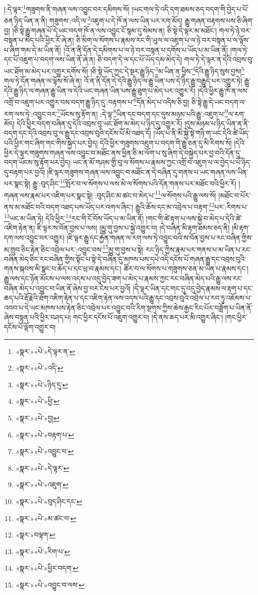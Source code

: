 །:དེ་ལྟར་\footnote{«སྣར་»«པེ་»དེ་ལྟར་ན་}གཟུགས་ནི་གཞན་ལས་འབྱུང་བར་དམིགས་སོ། །ཡང་གལ་ཏེ་འདི་དག་ཐམས་ཅད་བདག་གི་བྱེད་པ་པོ་ཅན་ཉིད་ཡིན་ན་ནི། གཟུགས་:འདི་ལ་\footnote{«སྣར་»«པེ་»འདི་}འཇུག་པ་དེ་ཁོ་ན་ལས་ཡིན་པར་རག་མོད། རྒྱུ་གཞན་བརྟགས་པས་ཅི་ཞིག་བྱ། །ཅི་སྟེ་རྒྱུ་གཞན་པོ་དེ་ཡང་བདག་ཁོ་ན་ལས་འབྱུང་ངོ་སྙམ་དུ་སེམས་ན། ཅི་སྟེ་དེ་ལྟར་མ་མཐོང་། གལ་ཏེ་ཉེ་བར་བསྟན་པ་མེད་པའི་ཕྱིར་རོ་ཞེ་ན། ཅི་མིག་ལ་སོགས་པ་རྣམས་རང་གི་ཡུལ་ལ་འཇུག་པ་ལ་ཉེ་བར་བསྟན་པ་ལ་ལྟོས་པ་ཞིག་གམ་དེ་མ་ཡིན་ནོ། །འོ་ན་ནི་དོན་དེ་དམིགས་པ་ལ་ཉེ་བར་བསྟན་པ་དགོས་པ་ཡོད་པ་མ་ཡིན་ནོ། །གལ་ཏེ་དང་པོ་འཇུག་པ་བདག་ལས་ཡིན་ནོ་ཞེ་ན། ཅི་བདག་དེ་ལ་དང་པོ་ཡོད་དམ་མེད་དེ། གལ་ཏེ་དེ་ལྟར་ན་དེའི་འབྲས་བུ་ཡང་ཐོག་མ་མེད་པར་འགྱུར་དགོས་སོ། །ཅི་སྟེ་ཡོད་ཀྱང་དེ་སྔར་རྒྱུ་ཉིད་\footnote{«སྣར་»«པེ་»ཉིད་དུ་}མ་ཡིན་ན་ཕྱིས་\footnote{«སྣར་»«པེ་»ཕྱི་}དེའི་རྒྱུ་ཉིད་སུས་བྱས།\footnote{«སྣར་»«པེ་»བྱ།} གལ་ཏེ་དོན་གཞན་ལ་ལྟོས་སོ་ཞེ་ན། འོ་ན་ནི་དོན་དེ་དེའི་རྒྱུ་ཉིད་ལ་རྒྱུ་ཡིན་པས་དེ་ཉིད་རྒྱུ་བརྒྱུད་པར་འགྱུར་ཏེ། རྒྱུ་དེའི་རྒྱུ་ཉིད་ལ་གཞན་རྒྱུ་ཡིན་ལ་དེའི་ཡང་གཞན་ཡིན་པས་རྒྱུ་ཐུག་པ་མེད་པར་འགྱུར་རོ། །དེའི་ཕྱིར་རྒྱུ་ཁོ་ན་ལས་འགྲོ་བ་འཇུག་པར་འགྱུར་བས་བདག་རྒྱུ་ཉིད་དུ་:བརྟགས་པ་\footnote{«སྣར་»«པེ་»བརྟག་པ་}དོན་མེད་པ་འདིས་ཅི་བྱ། ཅི་སྟེ་རྒྱུ་དེ་ཡང་བདག་ལ་རག་ལས་ཏེ་:འབྱུང་བར་\footnote{«སྣར་»«པེ་»འབྱུང་བ་}ཡོངས་སུ་རྟོག་ན། :དེ་ལྟ་\footnote{«སྣར་»«པེ་»དེ་ལྟར་}ཡིན་དང་བདག་དང་དུས་མཉམ་པའི་རྒྱུ་:འཇུག་པ་\footnote{«སྣར་»«པེ་»འཇུག་}ལ་རག་མོད། དེའི་ཕྱིར་བདག་བཞིན་དུ་དེའི་འབྲས་བུ་ཡང་ཐོག་མ་མེད་པ་ཉིད་དུ་འགྱུར་རོ། །དུས་མཉམ་པ་ཉིད་ཡིན་ན་ནི་བདག་དང་དེའི་འབྲས་བུ་ལ་རྒྱུ་དང་འབྲས་བུའི་དངོས་པོ་མི་འཐད་དོ། །ཡོད་པ་ནི་མི་སྐྱེ་སྟེ་གཉི་ག་ཡང་དེའི་ཚེ་ཡོད་པའི་ཕྱིར་གང་ཞིག་གང་གིས་སྐྱེད་པར་བྱེད། དེའི་ཕྱིར་གཟུགས་འཇུག་པ་བདག་གི་རྒྱུ་ཅན་དུ་མི་རིགས་སོ། །དེའི་ཕྱིར་དེ་ལྟར་གཟུགས་གཞན་ལས་འབྱུང་བ་མཐོང་ནས་ཕྱིན་ཅི་མ་ལོག་པ་སུ་ཞིག་དེ་བསྐྱེད་པར་བྱ་བའི་དོན་དུ་བདག་ཡོངས་སུ་རྟོག་པར་བྱེད། ཡང་ན་མོ་གཤམ་གྱི་བུ་ལ་སོགས་པ་རྣམས་ཀྱང་འགྲོ་བ་འཇུག་པ་ལ་བྱེད་པ་པོ་ཉིད་དུ་བརྟག་པར་བྱའོ། །ཇི་ལྟར་གཟུགས་གཞན་ལས་འབྱུང་བ་མཐོང་ན་དེ་བཞིན་དུ་གནས་པ་ཡང་གཞན་ལས་ཡིན་པར་སྣང་སྟེ། རྒྱུ་:བུད་ཤིང་\footnote{«སྣར་»«པེ་»བུད་ཤིང་དང་}སྤོར་བ་ལ་སོགས་པ་ལས་མེ་ལ་སོགས་པའི་དོན་གནས་པར་མཐོང་བའི་ཕྱིར་རོ། །གཞན་ལས་རྣམ་པར་འཇིག་པར་སྣང་སྟེ། :བུད་ཤིང་མ་ཚང་བ་མེད་པ་\footnote{«སྣར་»«པེ་»མ་ཚང་བ་}ལ་སོགས་པའི་རྒྱུ་ལས་སོ། །མཐོང་བ་པོར་ནས་མ་མཐོང་བའི་བདག་འཐད་པས་ཡོད་པར་འགལ་ཞིང་། རྒྱུའི་ཆོས་དང་མ་འབྲེལ་པ་བརྟག་\footnote{«སྣར་»བལྟག་}པར་:རིགས་པ་\footnote{«སྣར་»«པེ་»རིག་པ་}ཡང་མ་ཡིན་ཏེ། དེའི་ཕྱིར་\footnote{«སྣར་»«པེ་»ཕྱིར་བདག་}རང་གི་ངོ་བོས་ཡོད་པ་མ་ཡིན་ནོ། །གང་གི་ཚེ་རྟག་པ་ལས་སྐྱེ་བ་མེད་པ་དེའི་ཚེ་འཇིག་རྟེན་ན། ཇི་ལྟར་ས་བོན་བྱས་པ་ལས། །མྱུ་གུ་བྱས་པ་སྐྱེ་འགྱུར་བ། །དེ་བཞིན་མི་རྟག་ཐམས་ཅད་ནི། །མི་རྟག་དག་ལས་འབྱུང་བར་འགྱུར། །ཇི་ལྟར་རྒྱུ་དང་རྐྱེན་གཞན་ལ་རག་ལས་ཏེ་འབྱུང་བའི་ས་བོན་བྱས་པ་རང་བཞིན་གྱིས་མ་གྲུབ་ཅིང་རྟེན་ཅིང་འབྲེལ་པར་:འབྱུང་བས་\footnote{«སྣར་»«པེ་»འབྱུང་བ་ལས་}མྱུ་གུ་བྱས་པ་སྟེ། རང་ཉིད་ཀྱིས་རྣམ་པར་གནས་པ་མ་ཡིན་པ་རང་བཞིན་མེད་ཅིང་རང་བཞིན་གྱིས་སྟོང་པ་སྟེ་དེ་བཞིན་དུ་མཁས་པས་དཔེ་འདི་དངོས་པོ་གཞན་རྒྱུ་དང་འབྲས་བུའི་གནས་སྐབས་མི་སྣང་བ་ཆོད་པ་དང་ཕྲ་བ་རྣམས་དང་། ཚོར་བ་ལ་སོགས་པ་གཟུགས་ཅན་མ་ཡིན་པ་རྣམས་དང་། རྒྱུ་ལས་དང་ཉོན་མོངས་པ་ལས་འདས་པ་འདུ་བྱེད་ཟག་པ་མེད་པ་རྣམས་ཀྱང་རང་བཞིན་མེད་པའི་རྒྱུ་ལས་རང་བཞིན་མེད་པ་འབྱུང་བ་ཡིན་ནོ་ཞེས་བྱ་བར་ངེས་པར་བྱའོ། །དེ་ལྟར་ཡིན་དང་གང་དུ་འདུ་བྱེད་རྣམས་ལ་རྟག་པ་དང་ཆད་པའི་རྡོ་རྗེའི་ཐོག་འཇིག་རྟེན་པ་དང་འཇིག་རྟེན་ལས་འདས་པའི་རྒྱུ་དང་འབྲས་བུའི་འབྲེལ་པ་རབ་ཏུ་འཇོམས་པ་འབབ་པ་དེ་ཡང་མཁས་པས་རྟེན་ཅིང་འབྲེལ་པར་འབྱུང་བའི་རིག་སྔགས་ཀྱིས་ཆེས་རྒྱང་རིང་པོར་བཟློག་པ་ཡིན་ནོ་ཞེས་བསྟན་པའི་ཕྱིར་བཤད་པ། གང་ཕྱིར་དངོས་པོ་འཇུག་འགྱུར་བ། །དེ་ནས་ཆད་པར་མི་འགྱུར་ཞིང་། །གང་ཕྱིར་དངོས་པོ་ལྡོག་འགྱུར་བ། 